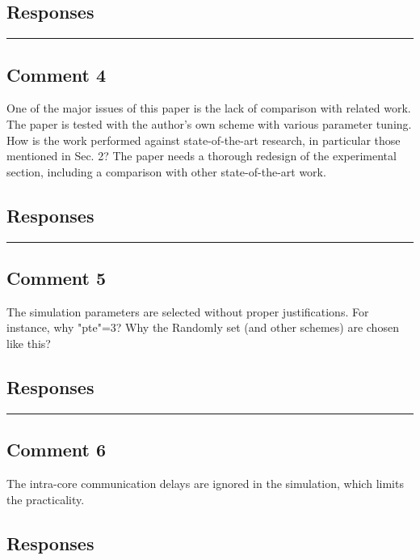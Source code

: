 \documentclass[10pt,journal, compsoc]{IEEEtran}
\begin{document}
\subsection*{Responses}


\noindent\rule[0.25\baselineskip]{252pt}{1pt}


\subsection*{Comment 4}
One of the major issues of this paper is the lack of comparison with related work. The paper is tested with the author's own scheme with various parameter tuning. How is the work performed against state-of-the-art research, in particular those mentioned in Sec. 2? The paper needs a thorough redesign of the experimental section, including a comparison with other state-of-the-art work.

\subsection*{Responses}


\noindent\rule[0.25\baselineskip]{252pt}{1pt}


\subsection*{Comment 5}
The simulation parameters are selected without proper justifications. For instance, why "pte"=3? Why the Randomly set (and other schemes) are chosen like this?

\subsection*{Responses}


\noindent\rule[0.25\baselineskip]{252pt}{1pt}


\subsection*{Comment 6}
The intra-core communication delays are ignored in the simulation, which limits the practicality.

\subsection*{Responses}
\end{document}

